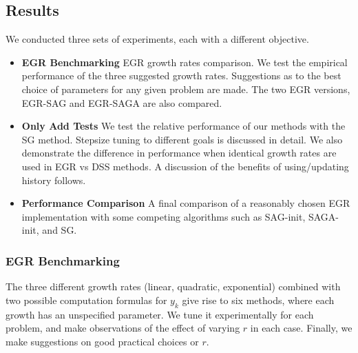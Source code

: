 \documentclass[11pt]{article}
\begin{document}
   
  
   
   \subsection{Results}

   We conducted three sets of experiments, each with a different objective. 
   \begin{itemize}
    \item \textbf{EGR Benchmarking} EGR growth rates comparison. We test the empirical performance of the three suggested growth rates. Suggestions as to the best choice of parameters for any given problem are made. The two EGR versions, EGR-SAG and EGR-SAGA are also compared. 
    \item \textbf{Only Add Tests} We test the relative performance of our methods with the SG method. Stepsize tuning to different goals is discussed in detail. We also demonstrate the difference in performance when identical growth rates are used in EGR vs DSS methods. A discussion of the benefits of using/updating history follows. 
   	\item \textbf{Performance Comparison} A final comparison of a reasonably chosen EGR implementation with some competing algorithms such as SAG-init, SAGA-init, and SG.
   \end{itemize}

   
   \subsubsection{EGR Benchmarking}
   
   The three different growth rates (linear, quadratic, exponential) combined with two possible computation formulas for $y_k$ give rise to six methods, where each growth has an unspecified parameter. We tune it experimentally for each problem, and make observations of the effect of varying $r$ in each case. Finally, we make suggestions on good practical choices or $r$. 
   
\end{document}
